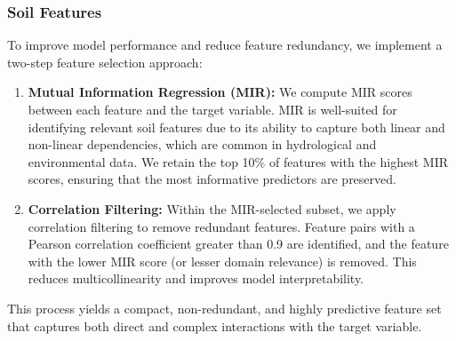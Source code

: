\documentclass[a4paper,12pt]{article}
\begin{document}
\subsubsection{Soil Features}
To improve model performance and reduce feature redundancy, we implement a two-step feature selection approach:
\begin{enumerate}
    \item \textbf{Mutual Information Regression (MIR):} We compute MIR scores between each feature and the target variable. MIR is well-suited for 
    identifying relevant soil features due to its ability to capture both linear and non-linear dependencies, which are common in hydrological and 
    environmental data. We retain the top 10\% of features with the highest MIR scores, ensuring that the most informative predictors are preserved.
    \item \textbf{Correlation Filtering:} Within the MIR-selected subset, we apply correlation filtering to remove redundant features. Feature pairs 
    with a Pearson correlation coefficient greater than 0.9 are identified, and the feature with the lower MIR score (or lesser domain relevance) is 
    removed. This reduces multicollinearity and improves model interpretability.
\end{enumerate}
\noindent This process yields a compact, non-redundant, and highly predictive feature set that captures both direct and complex interactions with the target variable.
\end{document}
